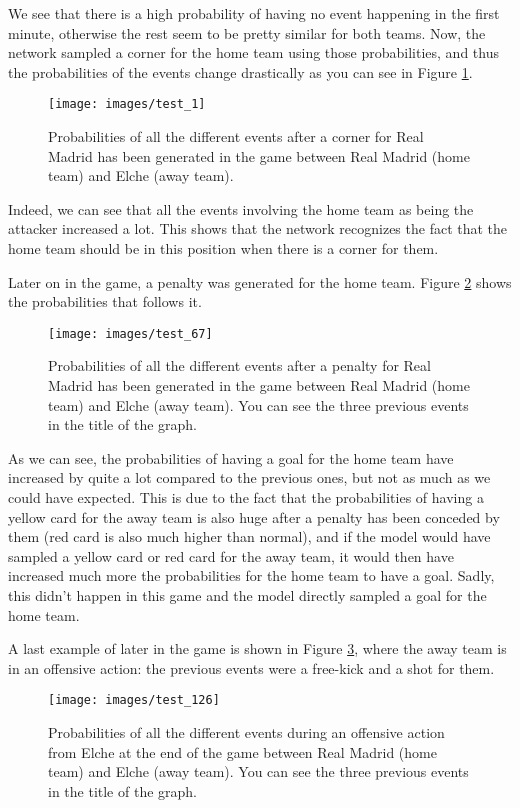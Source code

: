 \documentclass[10pt,conference,onecolumn]{IEEEtran}
\begin{document}
We see that there is a high probability of having no event happening in the first minute, otherwise the rest seem to be pretty similar for both teams. Now, the network sampled a corner for the home team using those probabilities, and thus the probabilities of the events change drastically as you can see in Figure \ref{fig:test_1}.

\begin{figure}[H]
\centering
\texttt{[image: images/test\_1]}
\caption{Probabilities of all the different events after a corner for Real Madrid has been generated in the game between Real Madrid (home team) and Elche (away team).}
\label{fig:test_1}
\end{figure}

Indeed, we can see that all the events involving the home team as being the attacker increased a lot. This shows that the network recognizes the fact that the home team should be in this position when there is a corner for them.

Later on in the game, a penalty was generated for the home team. Figure \ref{fig:test_67} shows the probabilities that follows it.

\begin{figure}[H]
\centering
\texttt{[image: images/test\_67]}
\caption{Probabilities of all the different events after a penalty for Real Madrid has been generated in the game between Real Madrid (home team) and Elche (away team). You can see the three previous events in the title of the graph.}
\label{fig:test_67}
\end{figure}

As we can see, the probabilities of having a goal for the home team have increased by quite a lot compared to the previous ones, but not as much as we could have expected. This is due to the fact that the probabilities of having a yellow card for the away team is also huge after a penalty has been conceded by them (red card is also much higher than normal), and if the model would have sampled a yellow card or red card for the away team, it would then have increased much more the probabilities for the home team to have a goal. Sadly, this didn't happen in this game and the model directly sampled a goal for the home team.

A last example of later in the game is shown in Figure \ref{fig:test_126}, where the away team is in an offensive action: the previous events were a free-kick and a shot for them.

\begin{figure}[H]
\centering
\texttt{[image: images/test\_126]}
\caption{Probabilities of all the different events during an offensive action from Elche at the end of the game between Real Madrid (home team) and Elche (away team). You can see the three previous events in the title of the graph.}
\label{fig:test_126}
\end{figure}
\end{document}

